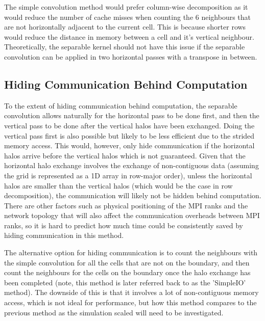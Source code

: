     The simple convolution method would prefer column-wise decomposition as it would reduce the number of cache misses
    when counting the 6 neighbours that are not horizontally adjacent to the current cell.
    This is because shorter rows would reduce the distance in memory between a cell and it's vertical neighbour.
    Theoretically, the separable kernel should not have this issue if the separable convolution can be applied in two horizontal
    passes with a transpose in between.

    \subsection{Hiding Communication Behind Computation}\label{subsec:hiding-comms}
    To the extent of hiding communication behind computation, the separable convolution allows naturally for the horizontal
    pass to be done first, and then the vertical pass to be done after the vertical halos have been exchanged.
    Doing the vertical pass first is also possible but likely to be less efficient due to the strided memory access.
    This would, however, only hide communication if the horizontal halos arrive before the vertical halos which is not guaranteed.
    Given that the horizontal halo exchange involves the exchange of non-contiguous data (assuming the grid is represented
    as a 1D array in row-major order), unless the horizontal halos are smaller than the vertical halos (which would be
    the case in row decomposition), the communication will likely not be hidden behind computation.
    There are other factors such as physical positioning of the MPI ranks and the network topology that will also affect
    the communication overheads between MPI ranks, so it is hard to predict how much time could be consistently saved by
    hiding communication in this method.

    The alternative option for hiding communication is to count the neighbours with the simple convolution
    for all the cells that are not on the boundary, and then count the neighbours for the cells on the boundary once the halo
    exchange has been completed (note, this method is later referred back to as the 'SimpleIO' method).
    The downside of this is that it involves a lot of non-contiguous memory access, which is not ideal for performance, but
    how this method compares to the previous method as the simulation scaled will need to be investigated.

